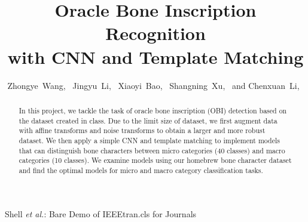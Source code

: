 \documentclass[journal]{IEEEtran}
\begin{document}
%
\title{Oracle Bone Inscription Recognition\\ with CNN and Template Matching}
%
%
%

\author{
	Zhongye~Wang,~
	Jingyu~Li,~
	Xiaoyi~Bao,~
	Shangning~Xu,~
	and Chenxuan~Li,~
}

%
{Shell \MakeLowercase{\textit{et al.}}: Bare Demo of IEEEtran.cls for Journals}
%


\maketitle

\begin{abstract}
	In this project, we tackle the task of oracle bone inscription (OBI) detection based on the dataset created in class.
	Due to the limit size of dataset, we first augment data with affine transforms and noise transforms to obtain a larger and more robust dataset.
	We then apply a simple CNN and template matching to implement models that can distinguish bone characters between micro categories (40 classes) and macro categories (10 classes).
	We examine models using our homebrew bone character dataset and find the optimal models for micro and macro category classification tasks.
\end{abstract}
\end{document}
